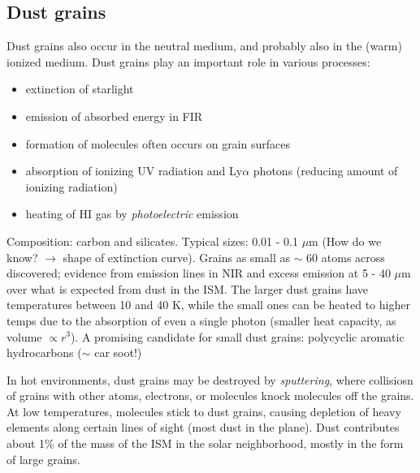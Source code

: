 \documentclass[12pt]{article}
\newcommand{\mar}[1]{\hspace{0pt}\marginpar{-\textcolor{black}{#1}-}}
\begin{document}
\subsection{Dust grains}
\mar{8}Dust grains also occur in the neutral medium, and
probably also in the (warm) ionized medium. Dust grains play an important
role in various processes:
\begin{itemize}
    \item extinction of starlight
    \item emission of absorbed energy in FIR
    \item formation of molecules often occurs on grain surfaces
    \item absorption of ionizing UV radiation and Ly$\alpha$ photons
        (reducing amount of ionizing radiation)
    \item heating of HI gas by \emph{photoelectric} emission
\end{itemize}
Composition: carbon and silicates. Typical sizes: 0.01 - 0.1 $\mu$m
(How do we know? $\rightarrow$ shape of extinction curve). Grains as small
as $\sim$ 60 atoms across discovered; evidence from emission lines in NIR
and excess emission at 5 - 40 $\mu$m over what is expected from dust in the ISM\@.
The larger dust grains have temperatures between 10 and 40 K, while the small
ones can be heated to higher temps due to the absorption of even a single
photon (smaller heat capacity, as volume $\propto r^{3}$). A promising
candidate for small dust grains: polycyclic aromatic hydrocarbons
($\sim$ car soot!)

In hot environments, dust grains may be destroyed by \textit{sputtering}, where
collisiosn of grains with other atoms, electrons, or molecules knock molecules
off the grains. \mar{9}At low temperatures, molecules stick to dust grains,
causing depletion of heavy elements along certain lines of sight (most dust in
the plane). Dust contributes about 1\% of the mass of the ISM in the solar
neighborhood, mostly in the form of large grains.
\end{document}
